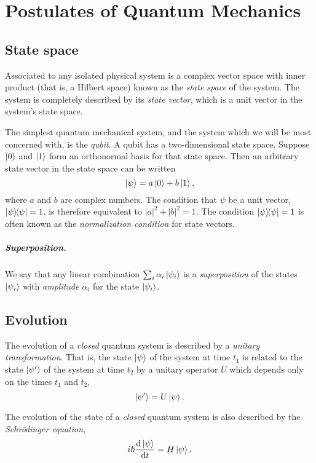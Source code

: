 \chapter{Postulates of Quantum Mechanics}

\section{State space}

\begin{postulate}
  Associated to any isolated physical system is a complex vector space with
  inner product (that is, a Hilbert space) known as the \emph{state space} of
  the system. The system is completely described by its \emph{state vector},
  which is a unit vector in the system's state space.
\end{postulate}

The simplest quantum mechanical system, and the system which we will be most
concerned with, is the \emph{qubit}. A qubit has a two-dimensional state space.
Suppose $\ket{0}$ and $\ket{1}$ form an orthonormal basis for that state space.
Then an arbitrary state vector in the state space can be written
\begin{equation*}
  \ket{\psi} = a\ket{0} + b\ket{1},
\end{equation*} where $a$ and $b$ are complex numbers. The condition that
$\psi$ be a unit vector, $\ketbra{\psi}{\psi} = 1$, is therefore equivalent to
$|a|^2 + |b|^2 = 1$. The condition $\ketbra{\psi}{\psi} = 1$ is often known as
the \emph{normalization condition} for state vectors.

\paragraph{Superposition.} We say that any linear combination $\sum_i \alpha_i
\ket{\psi_i}$ is a \emph{superposition} of the states $\ket{\psi_i}$ with
\emph{amplitude} $\alpha_i$ for the state $\ket{\psi_i}$.

\section{Evolution}

\begin{postulate}
  The evolution of a \emph{closed} quantum system is described by a
  \emph{unitary transformation}. That is, the state $\ket{\psi}$ of the system
  at time $t_1$ is related to the state $\ket{\psi'}$ of the system at time
  $t_2$ by a unitary operator $U$ which depends only on the times $t_1$ and
  $t_2$, \begin{equation*}
    \ket{\psi'} = U\ket{\psi}.
  \end{equation*}

  The evolution of the state of a \emph{closed} quantum system is also
  described by the \emph{Schr{\"o}dinger equation}, \begin{equation}
    i\hbar\frac{\mathrm{d}\ket{\psi}}{\mathrm{d}t} = H\ket{\psi}.
    \label{eq:sch-eq}
  \end{equation}
\end{postulate}

